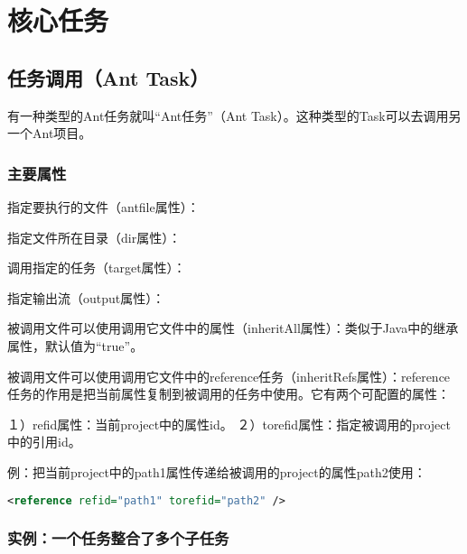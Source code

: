 \chapter{核心任务}

\section{任务调用（Ant Task）}

有一种类型的Ant任务就叫“Ant任务”（Ant Task）。这种类型的Task可以去调用另一个Ant项目。

\subsection{主要属性}

指定要执行的文件（antfile属性）：





指定文件所在目录（dir属性）：



调用指定的任务（target属性）：





指定输出流（output属性）：



被调用文件可以使用调用它文件中的属性（inheritAll属性）：类似于Java中的继承属性，默认值为“true”。

被调用文件可以使用调用它文件中的reference任务（inheritRefs属性）：reference任务的作用是把当前属性复制到被调用的任务中使用。它有两个可配置的属性：

１）refid属性：当前project中的属性id。
２）torefid属性：指定被调用的project中的引用id。

例：把当前project中的path1属性传递给被调用的project的属性path2使用：

\begin{lstlisting}[language=XML]
	<reference refid="path1" torefid="path2" />
\end{lstlisting}

\subsection{实例：一个任务整合了多个子任务}

